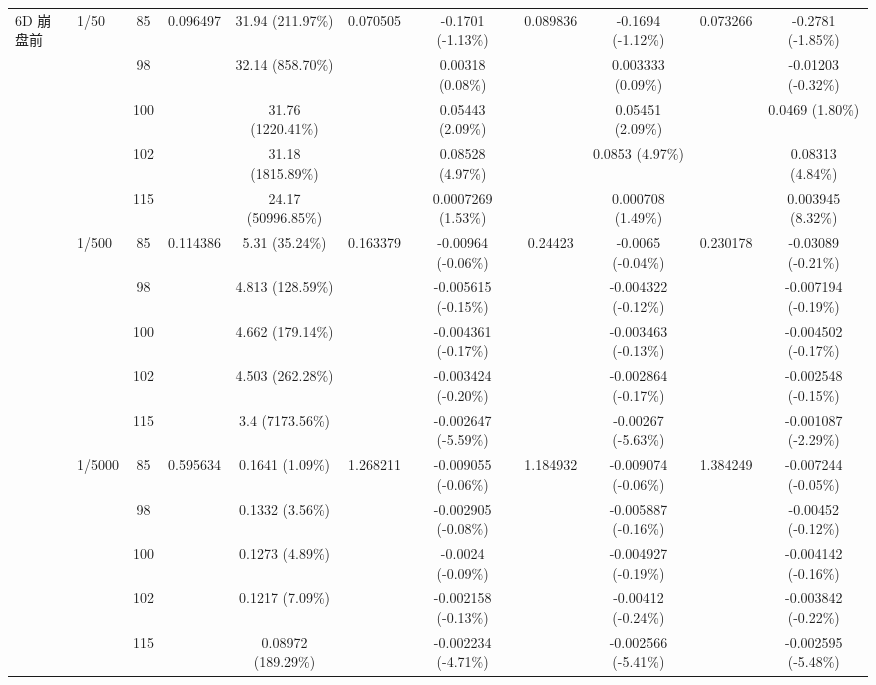 \begin{table}[htbp]
{\begin{tabular}{llccccccccc}
\multirow{15}{*}{6D 崩盘前}
& \multirow{5}{*}{1/50} & 85 & \multirow{5}{*}{0.096497} & 31.94 (211.97\%) & \multirow{5}{*}{0.070505} & -0.1701 (-1.13\%) & \multirow{5}{*}{0.089836} & -0.1694 (-1.12\%) & \multirow{5}{*}{0.073266} & -0.2781 (-1.85\%) \\
& & 98 & & 32.14 (858.70\%) & & 0.00318 (0.08\%) & & 0.003333 (0.09\%) & & -0.01203 (-0.32\%) \\
& & 100 & & 31.76 (1220.41\%) & & 0.05443 (2.09\%) & & 0.05451 (2.09\%) & & 0.0469 (1.80\%) \\
& & 102 & & 31.18 (1815.89\%) & & 0.08528 (4.97\%) & & 0.0853 (4.97\%) & & 0.08313 (4.84\%) \\
& & 115 & & 24.17 (50996.85\%) & & 0.0007269 (1.53\%) & & 0.000708 (1.49\%) & & 0.003945 (8.32\%) \\
\cmidrule(lr){2-11}
& \multirow{5}{*}{1/500} & 85 & \multirow{5}{*}{0.114386} & 5.31 (35.24\%) & \multirow{5}{*}{0.163379} & -0.00964 (-0.06\%) & \multirow{5}{*}{0.24423} & -0.0065 (-0.04\%) & \multirow{5}{*}{0.230178} & -0.03089 (-0.21\%) \\
& & 98 & & 4.813 (128.59\%) & & -0.005615 (-0.15\%) & & -0.004322 (-0.12\%) & & -0.007194 (-0.19\%) \\
& & 100 & & 4.662 (179.14\%) & & -0.004361 (-0.17\%) & & -0.003463 (-0.13\%) & & -0.004502 (-0.17\%) \\
& & 102 & & 4.503 (262.28\%) & & -0.003424 (-0.20\%) & & -0.002864 (-0.17\%) & & -0.002548 (-0.15\%) \\
& & 115 & & 3.4 (7173.56\%) & & -0.002647 (-5.59\%) & & -0.00267 (-5.63\%) & & -0.001087 (-2.29\%) \\
\cmidrule(lr){2-11}
& \multirow{5}{*}{1/5000} & 85 & \multirow{5}{*}{0.595634} & 0.1641 (1.09\%) & \multirow{5}{*}{1.268211} & -0.009055 (-0.06\%) & \multirow{5}{*}{1.184932} & -0.009074 (-0.06\%) & \multirow{5}{*}{1.384249} & -0.007244 (-0.05\%) \\
& & 98 & & 0.1332 (3.56\%) & & -0.002905 (-0.08\%) & & -0.005887 (-0.16\%) & & -0.00452 (-0.12\%) \\
& & 100 & & 0.1273 (4.89\%) & & -0.0024 (-0.09\%) & & -0.004927 (-0.19\%) & & -0.004142 (-0.16\%) \\
& & 102 & & 0.1217 (7.09\%) & & -0.002158 (-0.13\%) & & -0.00412 (-0.24\%) & & -0.003842 (-0.22\%) \\
& & 115 & & 0.08972 (189.29\%) & & -0.002234 (-4.71\%) & & -0.002566 (-5.41\%) & & -0.002595 (-5.48\%) \\
\midrule


\end{tabular}}
\end{table}
